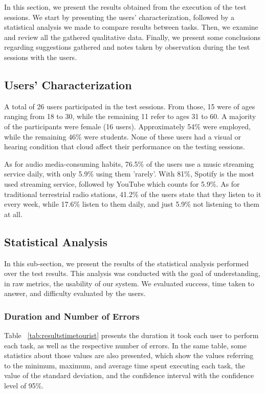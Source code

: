 In this section, we present the results obtained from the execution of the test sessions. We start by presenting the users’ characterization, followed by a statistical analysis we made to compare results between tasks. Then, we examine and review all the gathered qualitative data. Finally, we present some conclusions regarding suggestions gathered and notes taken by observation during the test sessions with the users.

\subsection{Users’ Characterization}

A total of 26 users participated in the test sessions. From those, 15 were of ages ranging from 18 to 30, while the remaining 11 refer to ages 31 to 60. A majority of the participants were female (16 users). Approximately 54\% were employed, while the remaining 46\% were students. None of these users had a visual or hearing condition that cloud affect their performance on the testing sessions.

As for audio media-consuming habits, 76.5\% of the users use a music streaming service daily, with only 5.9\% using them 'rarely'. With 81\%, Spotify is the most used streaming service, followed by YouTube which counts for 5.9\%. As for traditional terrestrial radio stations, 41.2\% of the users state that they listen to it every week, while 17.6\% listen to them daily, and just 5.9\% not listening to them at all.

\subsection{Statistical Analysis}

In this sub-section, we present the results of the statistical analysis performed over the test results. This analysis was conducted with the goal of understanding, in raw metrics, the usability of our system. We evaluated success, time taken to answer, and difficulty evaluated by the users.

\subsubsection{Duration and Number of Errors}

Table ~\ref{tab:resultstimetourist} presents the duration it took each user to perform each task, as well as the respective number of errors. In the same table, some statistics about those values are also presented, which show the values referring to the minimum, maximum, and average time spent executing each task, the value of the standard deviation, and the confidence interval with the confidence level of 95\%.

